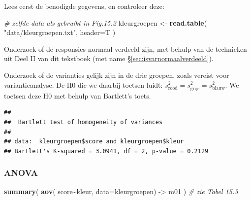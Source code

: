 \documentclass[
]{book}
\newenvironment{Shaded}{\begin{snugshade}}{\end{snugshade}}
\newcommand{\CommentTok}[1]{\textcolor[rgb]{0.56,0.35,0.01}{\textit{#1}}}
\newcommand{\DataTypeTok}[1]{\textcolor[rgb]{0.13,0.29,0.53}{#1}}
\newcommand{\KeywordTok}[1]{\textcolor[rgb]{0.13,0.29,0.53}{\textbf{#1}}}
\newcommand{\NormalTok}[1]{#1}
\newcommand{\OperatorTok}[1]{\textcolor[rgb]{0.81,0.36,0.00}{\textbf{#1}}}
\newcommand{\StringTok}[1]{\textcolor[rgb]{0.31,0.60,0.02}{#1}}
\begin{document}
Lees eerst de benodigde gegevens, en controleer deze:

\begin{Shaded}
\begin{Highlighting}[]
\CommentTok{\# zelfde data als gebruikt in Fig.15.2}
\NormalTok{kleurgroepen \textless{}{-}}\StringTok{ }\KeywordTok{read.table}\NormalTok{( }\StringTok{"data/kleurgroepen.txt"}\NormalTok{, }\DataTypeTok{header=}\NormalTok{T )}
\end{Highlighting}
\end{Shaded}

Onderzoek of de responsies normaal verdeeld zijn, met behulp van de
technieken uit Deel II van dit tekstboek (met name
§\ref{sec:isvarnormaalverdeeld}).

Onderzoek of de varianties gelijk zijn in de drie groepen, zoals vereist
voor variantieanalyse. De H0 die we daarbij toetsen luidt:
\(s^2_\textrm{rood} = s^2_\textrm{grijs} = s^2_\textrm{blauw}\). We
toetsen deze H0 met behulp van Bartlett's toets.

\begin{Shaded}
\end{Shaded}

\begin{verbatim}
## 
##  Bartlett test of homogeneity of variances
## 
## data:  kleurgroepen$score and kleurgroepen$kleur
## Bartlett's K-squared = 3.0941, df = 2, p-value = 0.2129
\end{verbatim}

\hypertarget{anova-1}{%
\subsubsection{ANOVA}\label{anova-1}}

\begin{Shaded}
\begin{Highlighting}[]
\KeywordTok{summary}\NormalTok{( }\KeywordTok{aov}\NormalTok{( score}\OperatorTok{\textasciitilde{}}\NormalTok{kleur, }\DataTypeTok{data=}\NormalTok{kleurgroepen) {-}\textgreater{}}\StringTok{ }\NormalTok{m01 ) }\CommentTok{\# zie Tabel 15.3}
\end{Highlighting}
\end{Shaded}
\end{document}
